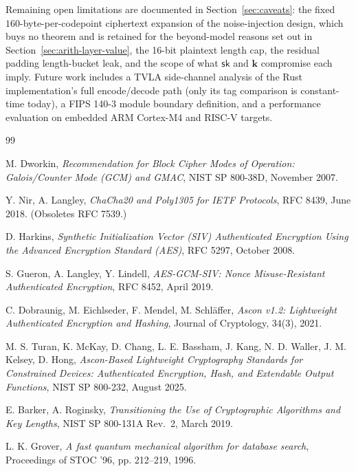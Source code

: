 \documentclass[11pt,a4paper]{article}
\begin{document}
Remaining open limitations are documented in Section~\ref{sec:caveats}:
the fixed $160$-byte-per-codepoint ciphertext expansion of the
noise-injection design, which buys no theorem and is retained for the
beyond-model reasons set out in Section~\ref{sec:arith-layer-value}, the
16-bit plaintext length cap, the residual padding length-bucket leak, and
the scope of what $\mathsf{sk}$ and $\mathbf{k}$ compromise each imply.
Future work includes a TVLA side-channel analysis of the Rust
implementation's full encode/decode path (only its tag comparison is
constant-time today), a FIPS 140-3 module boundary definition, and a
performance evaluation on embedded ARM Cortex-M4 and RISC-V targets.


\begin{thebibliography}{99}

  M. Dworkin,
  \emph{Recommendation for Block Cipher Modes of Operation: Galois/Counter Mode (GCM) and GMAC},
  NIST SP 800-38D, November 2007.

  Y. Nir, A. Langley,
  \emph{ChaCha20 and Poly1305 for IETF Protocols},
  RFC 8439, June 2018. (Obsoletes RFC 7539.)

  D. Harkins,
  \emph{Synthetic Initialization Vector (SIV) Authenticated Encryption Using the Advanced Encryption Standard (AES)},
  RFC 5297, October 2008.

  S. Gueron, A. Langley, Y. Lindell,
  \emph{AES-GCM-SIV: Nonce Misuse-Resistant Authenticated Encryption},
  RFC 8452, April 2019.

  C. Dobraunig, M. Eichlseder, F. Mendel, M. Schl\"{a}ffer,
  \emph{Ascon v1.2: Lightweight Authenticated Encryption and Hashing},
  Journal of Cryptology, 34(3), 2021.

  M. S. Turan, K. McKay, D. Chang, L. E. Bassham, J. Kang, N. D. Waller, J. M. Kelsey, D. Hong,
  \emph{Ascon-Based Lightweight Cryptography Standards for Constrained Devices: Authenticated Encryption, Hash, and Extendable Output Functions},
  NIST SP 800-232, August 2025.

  E. Barker, A. Roginsky,
  \emph{Transitioning the Use of Cryptographic Algorithms and Key Lengths},
  NIST SP 800-131A Rev.\ 2, March 2019.

  L. K. Grover,
  \emph{A fast quantum mechanical algorithm for database search},
  Proceedings of STOC '96, pp. 212--219, 1996.


\end{thebibliography}
\end{document}
